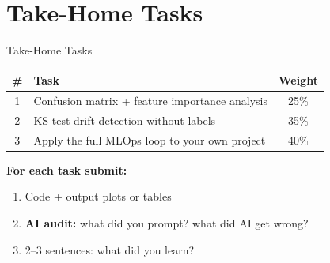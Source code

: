 \documentclass[aspectratio=169,11pt]{beamer}
\begin{document}
\section{Take-Home Tasks}

\begin{frame}[shrink=5]{Take-Home Tasks}

    \vspace{0.3cm}
    \begin{center}
    \begin{tabular}{clc}
        \toprule
        \textbf{\#} & \textbf{Task} & \textbf{Weight} \\
        \midrule
        1 & Confusion matrix + feature importance analysis & 25\% \\
        2 & KS-test drift detection without labels & 35\% \\
        3 & Apply the full MLOps loop to your own project & 40\% \\
        \bottomrule
    \end{tabular}
    \end{center}

    \vspace{0.3cm}
    \textbf{For each task submit:}
    \begin{enumerate}
        \item Code + output plots or tables
        \item \textbf{AI audit:} what did you prompt? what did AI get wrong?
        \item 2--3 sentences: what did you learn?
    \end{enumerate}
\end{frame}
\end{document}
